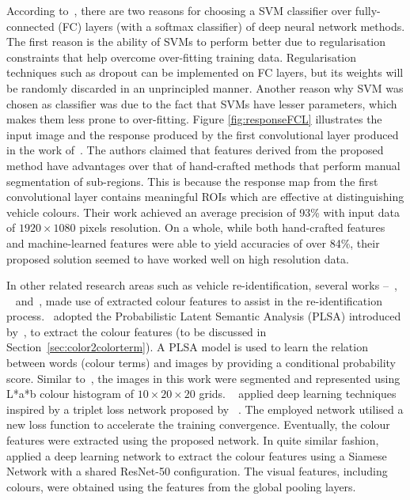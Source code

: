 According to~, there are two reasons for choosing a SVM classifier over fully-connected (FC) layers (with a softmax classifier) of deep neural network methods. The first reason is the ability of SVMs to perform
better due to regularisation constraints that help overcome over-fitting training data. Regularisation techniques such as dropout can be implemented on FC layers, but its weights will be randomly discarded in an unprincipled manner. Another reason why SVM was chosen as classifier was due to the fact that SVMs have lesser parameters, which makes them less prone to over-fitting. 
Figure
\ref{fig:responseFCL} illustrates the input image and the response produced by
the first convolutional layer produced in the work of~. The authors claimed that features derived from the proposed method have advantages over that of hand-crafted methods that perform manual segmentation of sub-regions. This is because the response map from the first convolutional layer contains meaningful ROIs which are effective at distinguishing vehicle colours. Their work achieved an average precision of 93\% with input data of $1920 \times 1080$ pixels resolution. On a whole, while both hand-crafted features and machine-learned features were able to yield accuracies of over 84\%, their proposed solution seemed to have worked well on high resolution data.



In other related research areas such as vehicle re-identification, several works --~, ~ and~, made use of extracted colour features to assist in the re-identification process.~ adopted the Probabilistic Latent Semantic Analysis (PLSA) introduced by~, to extract the colour features (to be discussed in Section~\ref{sec:color2colorterm}). A PLSA model is used to learn the relation between words (colour terms) and images by providing a conditional probability score. Similar to~, the images in this work were segmented and represented using L*a*b colour histogram of $10 \times 20 \times 20$ grids. ~ applied deep learning techniques inspired by a triplet loss network proposed by ~. The employed network utilised a new loss function to accelerate the training convergence. Eventually, the colour features were extracted using the proposed network. In quite similar fashion,~ applied a deep learning network to extract the colour features using a Siamese Network with a shared ResNet-50 configuration. The visual features, including colours, were obtained using the features from the global pooling layers.

